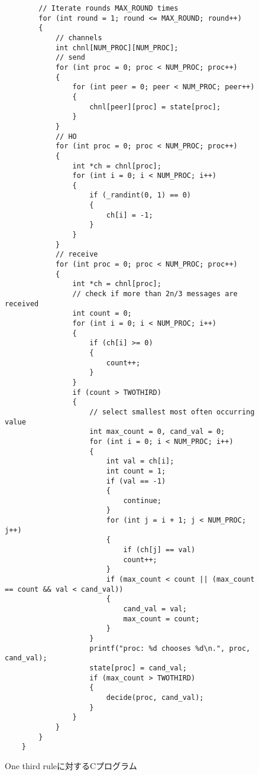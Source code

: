 \documentclass[technicalreport]{ieicej}
\theoremstyle{plain}
\begin{document}
\begin{figure*}
{\begin{lstlisting}
        // Iterate rounds MAX_ROUND times
        for (int round = 1; round <= MAX_ROUND; round++)
        {
            // channels
            int chnl[NUM_PROC][NUM_PROC];
            // send
            for (int proc = 0; proc < NUM_PROC; proc++)
            {
                for (int peer = 0; peer < NUM_PROC; peer++)
                {
                    chnl[peer][proc] = state[proc];
                }
            }
            // HO
            for (int proc = 0; proc < NUM_PROC; proc++)
            {
                int *ch = chnl[proc];
                for (int i = 0; i < NUM_PROC; i++)
                {
                    if (_randint(0, 1) == 0)
                    {
                        ch[i] = -1;
                    }
                }
            }
            // receive
            for (int proc = 0; proc < NUM_PROC; proc++)
            {
                int *ch = chnl[proc];
                // check if more than 2n/3 messages are received
                int count = 0;
                for (int i = 0; i < NUM_PROC; i++)
                {
                    if (ch[i] >= 0)
                    {
                        count++;
                    }
                }
                if (count > TWOTHIRD)
                {
                    // select smallest most often occurring value
                    int max_count = 0, cand_val = 0;
                    for (int i = 0; i < NUM_PROC; i++)
                    {
                        int val = ch[i];
                        int count = 1;
                        if (val == -1)
                        {
                            continue;
                        }
                        for (int j = i + 1; j < NUM_PROC; j++)
                        {
                            if (ch[j] == val)
                            count++;
                        }
                        if (max_count < count || (max_count == count && val < cand_val))
                        {
                            cand_val = val;
                            max_count = count;
                        }
                    }
                    printf("proc: %d chooses %d\n.", proc, cand_val);
                    state[proc] = cand_val;
                    if (max_count > TWOTHIRD)
                    {
                        decide(proc, cand_val);
                    }
                }
            }
        }
    }
\end{lstlisting}}
\caption{One third ruleに対するCプログラム}\label{fig:cprogram}
\end{figure*}
\end{document}
